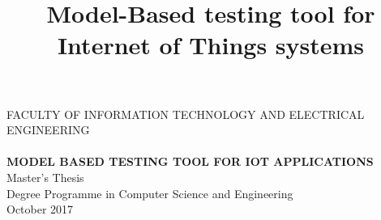 \documentclass[a4paper, 12pt,titlepage]{dithesis}
\title{Model-Based testing tool for Internet of Things systems}
\begin{document}
    \begin{titlepage}
        {\sffamily\fontsize{9}{1pt}\selectfont FACULTY OF INFORMATION TECHNOLOGY AND ELECTRICAL ENGINEERING\\}
        \vspace{65 mm}
        {\textbf{\fontsize{16}{19pt}\selectfont \getfirstname\ \getlastname }\\}
        \vspace{15 mm}
        {\textbf{\fontsize{18}{22pt}\selectfont MODEL BASED TESTING TOOL FOR IOT APPLICATIONS\\}}
        \vspace{60 mm}
        {\fontsize{14}{17}\selectfont Master's Thesis \\Degree Programme in Computer Science and Engineering \\ October 2017\\}
    \end{titlepage}
\end{document}
